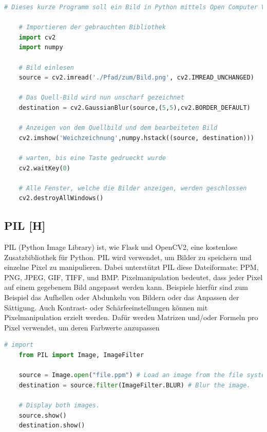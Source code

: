\begin{lstlisting}[language=Python,caption=OpenCV Demo,label=lst:tech:gaussianBlur]
    # Dieses kurze Programm soll ein Bild in Python mittels Open Computer Vision weichzeichnen
    
    # Importieren der gebrauchten Bibliothek
    import cv2
    import numpy
    
    # Bild einlesen
    source = cv2.imread('./Pfad/zum/Bild.png', cv2.IMREAD_UNCHANGED)
    
    # Das Quell-Bild wird nun unscharf gezeichnet
    destination = cv2.GaussianBlur(source,(5,5),cv2.BORDER_DEFAULT)

    # Anzeigen von dem Quellbild und dem bearbeiteten Bild 
    cv2.imshow('Weichzeichnung',numpy.hstack((source, destination)))

    # warten, bis eine Taste gedrueckt wurde
    cv2.waitKey(0) 

    # Alle Fenster, welche die Bilder anzeigen, werden geschlossen
    cv2.destroyAllWindows() 
\end{lstlisting}


\subsection{PIL [H]}
PIL (Python Image Library) ist, wie Flask und OpenCV2, eine kostenlose Zusatzbibliothek für Python.
PIL wird verwendet, um Bilder zu speichern und einzelne Pixel zu manipulieren. Dabei unterstützt PIL diese
Dateiformate: PPM, PNG, JPEG, GIF, TIFF, und BMP. Pixelmanipulation bedeutet, dass jeder Pixel auf einem
gegebenem Bild angepasst werden kann. Beispiele hierfür sind zum Beispiel das Aufhellen oder Abdunkeln von
Bildern oder das Anpassen der Sättigung. Auch Kontrast- oder Schärfeeinstellungen können mit
Pixelmanipulation erzielt werden. Dafür werden Matrizen und/oder Formeln pro Pixel verwendet, um
deren Farbwerte anzupassen
\\



\begin{lstlisting}[language=Python,caption=PIL Demo,label=lst:tech:PIL]
    # import
    from PIL import Image, ImageFilter  

    source = Image.open("file.ppm") # Load an image from the file system.
    destination = source.filter(ImageFilter.BLUR) # Blur the image.

    # Display both images.
    source.show() 
    destination.show()
\end{lstlisting}



